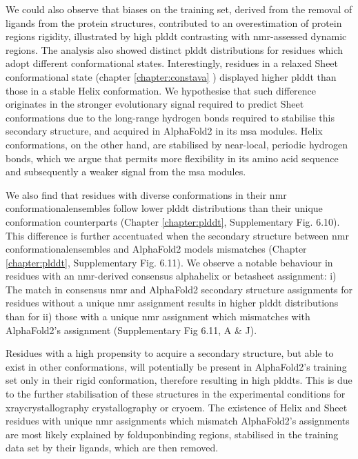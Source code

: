 We could also observe that biases on the training set, derived from the removal of ligands from the protein structures, contributed to an overestimation of protein regions rigidity, illustrated by high \gls{plddt} contrasting with \gls{nmr}-assessed dynamic regions. The analysis also showed distinct \gls{plddt} distributions for residues which adopt different conformational states. Interestingly, residues in a relaxed Sheet conformational state (chapter \ref{chapter:constava} \cite{gavalda-garcia_data-driven_2024}) displayed higher \gls{plddt} than those in a stable Helix \gls{conformation}. We hypothesise that such difference originates in the stronger evolutionary signal required to predict Sheet \glspl{conformation} due to the long-range hydrogen bonds required to stabilise this secondary structure, and acquired in AlphaFold2 in its \gls{msa} modules. Helix \glspl{conformation}, on the other hand, are stabilised by near-local, periodic hydrogen bonds, which we argue that permits more \gls{flexibility} in its amino acid sequence and subsequently a weaker signal from the \gls{msa} modules. 

We also find that residues with diverse \glspl{conformation} in their \gls{nmr} \glspl{conformationalensemble} follow lower \gls{plddt} distributions than their unique \gls{conformation} counterparts (Chapter \ref{chapter:plddt}, Supplementary Fig. 6.10). This difference is further accentuated when the secondary structure between \gls{nmr} \glspl{conformationalensemble} and AlphaFold2 models mismatches (Chapter \ref{chapter:plddt}, Supplementary Fig. 6.11). We observe a notable behaviour in residues with an \gls{nmr}-derived consensus \gls{alphahelix} or \gls{betasheet} assignment: i) The match in consensus \gls{nmr} and AlphaFold2 secondary structure assignments for residues without a unique \gls{nmr} assignment results in higher \gls{plddt} distributions than for ii) those with a unique \gls{nmr} assignment which mismatches with AlphaFold2's assignment (Supplementary Fig 6.11, A \& J). 

Residues with a high propensity to acquire a secondary structure, but able to exist in other \glspl{conformation}, will potentially be present in AlphaFold2's training set only in their rigid \gls{conformation}, therefore resulting in high \glspl{plddt}. This is due to the further stabilisation of these structures in the experimental conditions for \gls{xraycrystallography} crystallography or \gls{cryoem}. The existence of Helix and Sheet residues with unique \gls{nmr} assignments which mismatch AlphaFold2's assignments are most likely explained by \gls{folduponbinding} regions, stabilised in the training data set by their ligands, which are then removed. 

